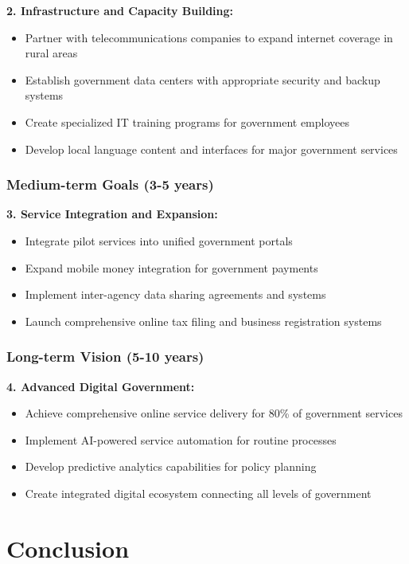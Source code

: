 \documentclass[12pt,a4paper]{article}
\begin{document}
\textbf{2. Infrastructure and Capacity Building:}
\begin{itemize}
    \item Partner with telecommunications companies to expand internet coverage in rural areas
    \item Establish government data centers with appropriate security and backup systems
    \item Create specialized IT training programs for government employees
    \item Develop local language content and interfaces for major government services
\end{itemize}

\subsubsection{Medium-term Goals (3-5 years)}

\textbf{3. Service Integration and Expansion:}
\begin{itemize}
    \item Integrate pilot services into unified government portals
    \item Expand mobile money integration for government payments
    \item Implement inter-agency data sharing agreements and systems
    \item Launch comprehensive online tax filing and business registration systems
\end{itemize}

\subsubsection{Long-term Vision (5-10 years)}

\textbf{4. Advanced Digital Government:}
\begin{itemize}
    \item Achieve comprehensive online service delivery for 80\% of government services
    \item Implement AI-powered service automation for routine processes
    \item Develop predictive analytics capabilities for policy planning
    \item Create integrated digital ecosystem connecting all levels of government
\end{itemize}

\section{Conclusion}
\end{document}
